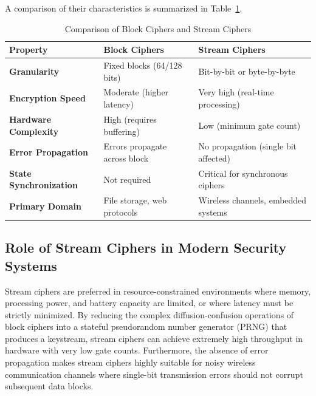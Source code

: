 A comparison of their characteristics is summarized in Table~\ref{tab:block_vs_stream}.

\begin{table}[h]
\centering
\caption{Comparison of Block Ciphers and Stream Ciphers}
\label{tab:block_vs_stream}
\begin{tabular}{@{}lll@{}}
\toprule
\textbf{Property} & \textbf{Block Ciphers} & \textbf{Stream Ciphers} \\ \midrule
\textbf{Granularity} & Fixed blocks (64/128 bits) & Bit-by-bit or byte-by-byte \\
\textbf{Encryption Speed} & Moderate (higher latency) & Very high (real-time processing) \\
\textbf{Hardware Complexity} & High (requires buffering) & Low (minimum gate count) \\
\textbf{Error Propagation} & Errors propagate across block & No propagation (single bit affected) \\
\textbf{State Synchronization} & Not required & Critical for synchronous ciphers \\
\textbf{Primary Domain} & File storage, web protocols & Wireless channels, embedded systems \\ \bottomrule
\end{tabular}
\end{table}

\subsection{Role of Stream Ciphers in Modern Security Systems}
Stream ciphers are preferred in resource-constrained environments where memory, processing power, and battery capacity are limited, or where latency must be strictly minimized. By reducing the complex diffusion-confusion operations of block ciphers into a stateful pseudorandom number generator (PRNG) that produces a keystream, stream ciphers can achieve extremely high throughput in hardware with very low gate counts. Furthermore, the absence of error propagation makes stream ciphers highly suitable for noisy wireless communication channels where single-bit transmission errors should not corrupt subsequent data blocks.

